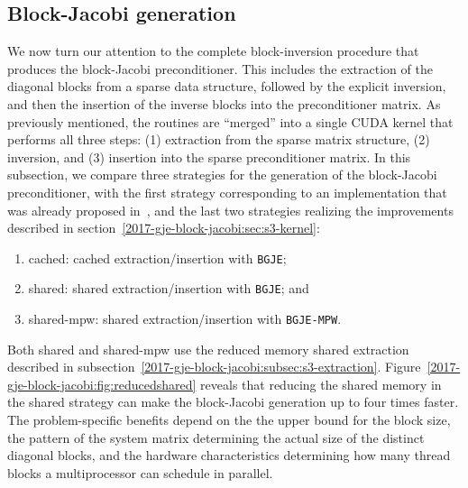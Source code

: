 \subsection{Block-Jacobi generation}


We now turn our attention to the complete block-inversion procedure that
produces the block-Jacobi preconditioner. This includes the extraction of the
diagonal blocks from a sparse data structure, followed by the explicit
inversion, and then the insertion of the inverse blocks into the preconditioner
matrix. As previously mentioned, the routines are ``merged'' into a single CUDA
kernel that performs all three steps: (1) extraction from the sparse matrix
structure, (2) inversion, and (3) insertion into the sparse preconditioner matrix. In
this subsection, we compare three strategies for the generation of the
block-Jacobi preconditioner, with the first strategy corresponding to an
implementation that was already proposed
in~\cite{Anzt:2017:BGE:3026937.3026940}, and the last two strategies realizing the
improvements described in section~\ref{2017-gje-block-jacobi:sec:s3-kernel}:
\begin{enumerate}
    \item {\sc cached}: cached extraction/insertion with {\tt BGJE};
    \item {\sc shared}: shared extraction/insertion with {\tt BGJE}; and
    \item {\sc shared-mpw}: shared extraction/insertion with {\tt BGJE-MPW}.
\end{enumerate}
Both {\sc shared} and {\sc shared-mpw} use the reduced memory shared extraction
described in subsection~\ref{2017-gje-block-jacobi:subsec:s3-extraction}.  
{
Figure~\ref{2017-gje-block-jacobi:fig:reducedshared} reveals that reducing the shared memory in the 
{\sc shared} strategy can make the block-Jacobi generation up to four times 
faster. The problem-specific benefits depend on the the upper bound for the 
block size, the pattern of the system matrix determining the actual size of the 
distinct diagonal blocks, and the hardware characteristics determining how many 
thread blocks a multiprocessor can schedule in parallel.}



